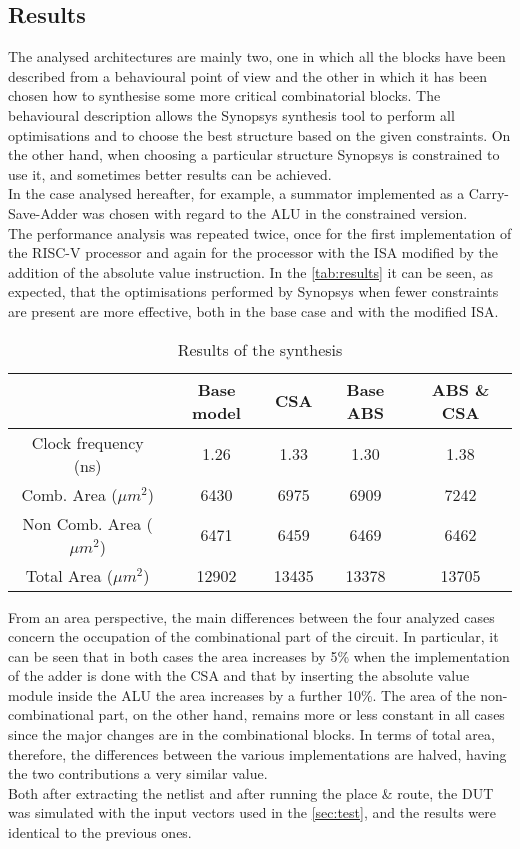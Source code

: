 \subsection{Results}
The analysed architectures are mainly two, one in which all the blocks have been described from a behavioural point of view and the other in which it has been chosen how to synthesise some more critical combinatorial blocks. The behavioural description allows the Synopsys synthesis tool to perform all optimisations and to choose the best structure based on the given constraints. On the other hand, when choosing a particular structure Synopsys is constrained to use it, and sometimes better results can be achieved.\\
In the case analysed hereafter, for example, a summator implemented as a Carry-Save-Adder was chosen with regard to the ALU in the constrained version.\\
The performance analysis was repeated twice, once for the first implementation of the RISC-V processor and again for the processor with the ISA modified by the addition of the absolute value instruction. In the \autoref{tab:results} it can be seen, as expected, that the optimisations performed by Synopsys when fewer constraints are present are more effective, both in the base case and with the modified ISA.\\
\begin{table}[H]
	\centering
	\begin{tabular}{c|c|c||c|c}
		& Base model & CSA & Base ABS & ABS  \& CSA \\
		\hline
		Clock frequency (ns) & 1.26 & 1.33 & 1.30 & 1.38 \\
		Comb. Area ($\mu m^2$) & 6430 & 6975 & 6909 & 7242 \\
		Non Comb. Area ($\mu m^2$) & 6471 & 6459 & 6469 & 6462 \\
		Total Area ($\mu m^2$)	& 12902 & 13435 & 13378 & 13705 \\
	\end{tabular}
	\caption{Results of the synthesis}
	\label{tab:results}
\end{table}

\noindent From an area perspective, the main differences between the four analyzed cases concern the occupation of the combinational part of the circuit. In particular, it can be seen that in both cases the area increases by 5\% when the implementation of the adder is done with the CSA and that by inserting the absolute value module inside the ALU the area increases by a further 10\%.
The area of the non-combinational part, on the other hand, remains more or less constant in all cases since the major changes are in the combinational blocks. In terms of total area, therefore, the differences between the various implementations are halved, having the two contributions a very similar value.\\
Both after extracting the netlist and after running the place \& route, the DUT was simulated with the input vectors used in the \autoref{sec:test}, and the results were identical to the previous ones. 